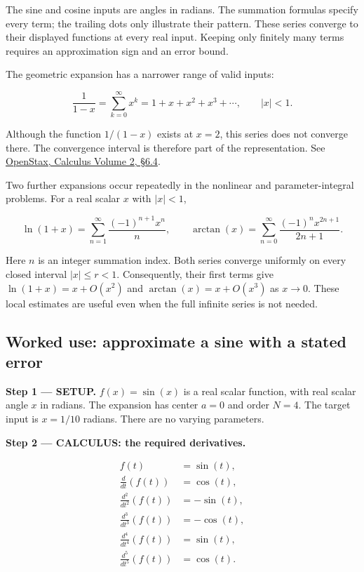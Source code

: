 \documentclass[11pt,oneside,openany]{book}
\begin{document}
The sine and cosine inputs are angles in radians. The summation formulas
specify every term; the trailing dots only illustrate their pattern. These
series converge to their displayed functions at every real input. Keeping
only finitely many terms requires an approximation sign and an error bound.

The geometric expansion has a narrower range of valid inputs:

\[
\frac{1}{1-x}=\sum_{k=0}^{\infty}x^k
=1+x+x^2+x^3+\cdots,\qquad |x|<1.
\]

Although the function \(1/(1-x)\) exists at \(x=2\), this series does not converge
there. The convergence interval is therefore part of the representation. See \href{https://openstax.org/books/calculus-volume-2/pages/6-4-working-with-taylor-series}{OpenStax, Calculus Volume 2, §6.4}.

Two further expansions occur repeatedly in the nonlinear and parameter-integral
problems. For a real scalar \(x\) with \(|x|<1\),

\[
\ln(1+x)=\sum_{n=1}^{\infty}\frac{(-1)^{n+1}x^n}{n},
\qquad
\arctan(x)=\sum_{n=0}^{\infty}\frac{(-1)^n x^{2n+1}}{2n+1}.
\]

Here \(n\) is an integer summation index. Both series converge uniformly on every
closed interval \(|x|\le r<1\). Consequently, their first terms give
\(\ln(1+x)=x+O(x^2)\) and \(\arctan(x)=x+O(x^3)\) as \(x\to0\). These local estimates
are useful even when the full infinite series is not needed.

\subsection{Worked use: approximate a sine with a stated error}

\textbf{Step 1 --- SETUP.} \(f(x)=\sin(x)\) is a real scalar function, with real scalar
angle \(x\) in radians. The expansion has center \(a=0\) and order \(N=4\). The target input is
\(x=1/10\) radians. There are no varying parameters.

\textbf{Step 2 --- CALCULUS: the required derivatives.}

\[
\begin{aligned}
f(t)&=\sin(t),\\
\frac{d}{dt}\left(f(t)\right)&=\cos(t),\\
\frac{d^2}{dt^2}\left(f(t)\right)&=-\sin(t),\\
\frac{d^3}{dt^3}\left(f(t)\right)&=-\cos(t),\\
\frac{d^4}{dt^4}\left(f(t)\right)&=\sin(t),\\
\frac{d^5}{dt^5}\left(f(t)\right)&=\cos(t).
\end{aligned}
\]
\end{document}
